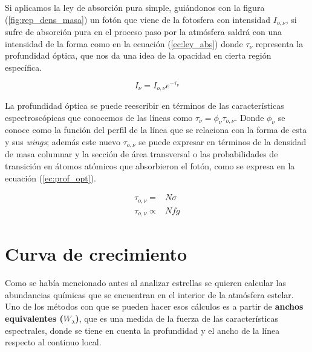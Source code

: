 \documentclass[12pt,oneside,openany,letter]{book}
\begin{document}
Si aplicamos la ley de absorción pura simple, guiándonos con la figura (\ref{fig:rep_dens_masa}) un fotón que viene de la fotosfera con intensidad $I_{o, \nu}$, si sufre de absorción pura en el proceso paso por la atmósfera saldrá con una intensidad de la forma como en la ecuación (\ref{ec:ley_abs}) donde $\tau_{\nu}$ representa la profundidad óptica, que nos da una idea de la opacidad en cierta región específica.

\begin{equation}
    I_{\nu} = I_{o,\nu} e^{- \tau_{\nu}}
    \label{ec:ley_abs}
\end{equation}

La profundidad óptica se puede reescribir en términos de las características espectroscópicas que conocemos de las líneas como $\tau_{\nu} = \phi_{\nu} \tau_{o, \nu}$. Donde $\phi_{\nu}$ se conoce como la función del perfil de la línea que se relaciona con la forma de esta y sus \textit{wings}; además este nuevo $\tau_{o, \nu}$ se puede expresar en términos de la densidad de masa columnar y la sección de área transversal o las probabilidades de transición en átomos atómicos que absorbieron el fotón, como se expresa en la ecuación (\ref{ec:prof_opt}).

\begin{equation}
    \begin{array}{cc}
        \tau_{o, \nu} =& N \sigma \\
        \tau_{o, \nu} \propto& N fg
    \end{array}
    \label{ec:prof_opt}
\end{equation}

\section{Curva de crecimiento}\label{CoG}

Como se había mencionado antes al analizar estrellas se quieren calcular las abundancias químicas que se encuentran en el interior de la atmósfera estelar. Uno de los métodos con que se pueden hacer esos cálculos es a partir de \textbf{anchos equivalentes ($W_{\lambda}$)}, que es una medida de la fuerza de las características espectrales, donde se tiene en cuenta la profundidad y el ancho de la línea respecto al continuo local. 
\end{document}
